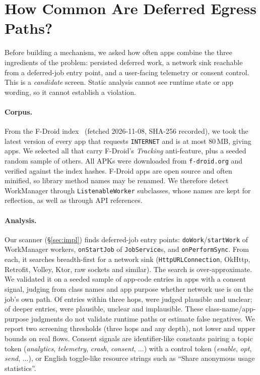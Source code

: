 \section{How Common Are Deferred Egress Paths?}
\label{sec:measure}

Before building a mechanism, we asked how often apps combine the three ingredients of the problem: persisted deferred
work, a network sink reachable from a deferred-job entry point, and a user-facing telemetry or consent control. This is a
\emph{candidate} screen. Static analysis cannot see runtime state or app wording, so it cannot establish a violation.

\paragraph{Corpus.} From the F-Droid index~\cite{fdroid} (fetched 2026-11-08, SHA-256 recorded), we took the latest version
of every app that requests \texttt{INTERNET} and is at most 80\,MB, giving \eligibleN{} apps. We selected all \trackN{} that
carry F-Droid's \emph{Tracking} anti-feature, plus a seeded random sample of \randN{} others. All \corpusN{} APKs were
downloaded from \texttt{f-droid.org} and verified against the index hashes. F-Droid apps are open source and often minified,
so library method names may be renamed. We therefore detect WorkManager through \texttt{ListenableWorker} subclasses,
whose names are kept for reflection, as well as through API references.

\paragraph{Analysis.} Our scanner (\S\ref{sec:impl}) finds deferred-job entry points: \texttt{doWork}/\texttt{startWork} of
WorkManager workers, \texttt{onStartJob} of \texttt{JobService}s, and \texttt{onPerformSync}. From each, it searches
breadth-first for a network sink (\texttt{HttpURLConnection}, OkHttp, Retrofit, Volley, Ktor, raw sockets and similar). The
search is over-approximate. We validated it on a seeded sample of \valN{} app-code entries in apps with a consent signal,
judging from class names and app purpose whether network use is on the job's own path. Of \valShallowN{} entries within three hops, \valShallowYes{} were judged plausible and \valShallowUnclear{} unclear;
of \valDeepN{} deeper entries, \valDeepYes{} were plausible, \valDeepUnclear{} unclear and \valDeepNo{} implausible. These class-name/app-purpose
judgments do not validate runtime paths or estimate false negatives. We report two screening thresholds
(three hops and any depth), not lower and upper bounds on real flows. Consent signals are identifier-like constants pairing a topic token
(\textit{analytics}, \textit{telemetry}, \textit{crash}, \textit{consent}, ...) with a control token (\textit{enable},
\textit{opt}, \textit{send}, ...), or English toggle-like resource strings such as ``Share anonymous usage statistics''.

